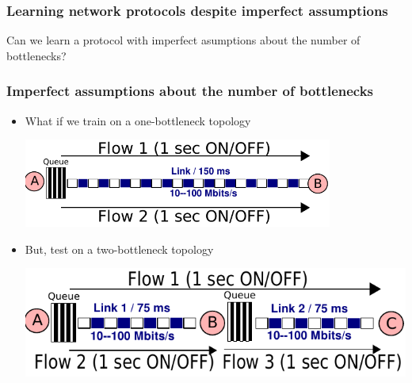 \begin{frame}
\frametitle{Learning network protocols despite imperfect assumptions}
\begin{centering}
Can we learn a protocol with imperfect asumptions about the number of bottlenecks?
\end{centering}
\end{frame}

\begin{frame}
\frametitle{Imperfect assumptions about the number of bottlenecks}
\large
\begin{centering}

\begin{itemize}
\item<2-> What if we train on a one-bottleneck topology\\
\begin{centering}
\includegraphics[width=0.8\textwidth]{onelink.pdf}
\end{centering}
\item<3-> But, test on a two-bottleneck topology\\
\begin{centering}
\includegraphics[width=0.8 \textwidth]{twolink.pdf}
\end{centering}
\end{itemize}
\end{centering}
\end{frame}

